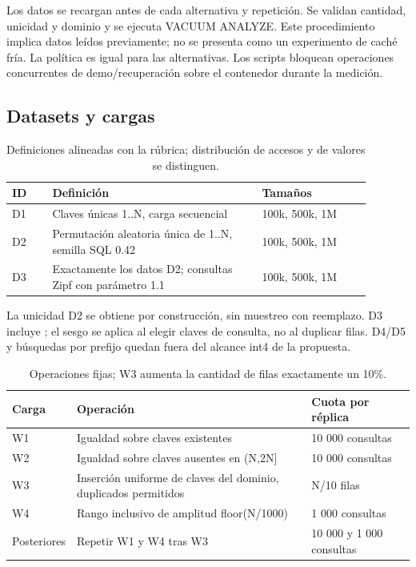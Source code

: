 \documentclass[11pt,a4paper]{article}
\newcommand{\code}[1]{\texttt{\detokenize{#1}}}
\begin{document}
Los datos se recargan antes de cada alternativa y repetición. Se validan cantidad,
unicidad y dominio y se ejecuta VACUUM ANALYZE. Este procedimiento implica datos
leídos previamente; no se presenta como un experimento de caché fría. La política
es igual para las alternativas. Los scripts bloquean operaciones concurrentes
de demo/recuperación sobre el contenedor durante la medición.

\subsection{Datasets y cargas}
\begin{table}[h]\centering\small
\begin{tabular}{p{0.1\linewidth}p{0.52\linewidth}p{0.27\linewidth}}
\toprule ID & Definición & Tamaños\\\midrule
D1 & Claves únicas 1..N, carga secuencial & 100k, 500k, 1M\\
D2 & Permutación aleatoria única de 1..N, semilla SQL 0.42 & 100k, 500k, 1M\\
D3 & Exactamente los datos D2; consultas Zipf con parámetro 1.1 & 100k, 500k, 1M\\\bottomrule
\end{tabular}\caption{Definiciones alineadas con la rúbrica; distribución de accesos y de valores se distinguen.}
\end{table}
La unicidad D2 se obtiene por construcción, sin muestreo con reemplazo. D3 incluye
\code{d2.sql}; el sesgo se aplica al elegir claves de consulta, no al duplicar
filas. D4/D5 y búsquedas por prefijo quedan fuera del alcance int4 de la propuesta.

\begin{table}[h]\centering\small
\begin{tabular}{p{.12\linewidth}p{.57\linewidth}p{.23\linewidth}}\toprule Carga & Operación & Cuota por réplica\\\midrule
W1 & Igualdad sobre claves existentes & 10 000 consultas\\
W2 & Igualdad sobre claves ausentes en (N,2N] & 10 000 consultas\\
W3 & Inserción uniforme de claves del dominio, duplicados permitidos & N/10 filas\\
W4 & Rango inclusivo de amplitud floor(N/1000) & 1 000 consultas\\
Posteriores & Repetir W1 y W4 tras W3 & 10 000 y 1 000 consultas\\\bottomrule
\end{tabular}\caption{Operaciones fijas; W3 aumenta la cantidad de filas exactamente un 10\%.}
\end{table}
\end{document}
